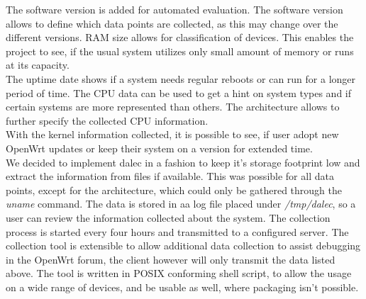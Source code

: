     The software version is added for automated evaluation. The software version allows to define which data points are collected, as this may change over the different versions. RAM size allows for classification of devices. This enables the project to see, if the usual system utilizes only small amount of memory or runs at its capacity.\\
    The uptime date shows if a system needs regular reboots or can run for a longer period of time. The CPU data can be used to get a hint on system types and if certain systems are more represented than others. The architecture allows to further specify the collected CPU information.\\
    With the kernel information collected, it is possible to see, if user adopt new OpenWrt updates or keep their system on a version for extended time.\\
    
    We decided to implement dalec in a fashion to keep it's storage footprint low and extract the information from files if available. This was possible for all data points, except for the architecture, which could only be gathered through the \textit{uname} command. The data is stored in aa log file placed under \textit{/tmp/dalec}, so a user can review the information collected about the system. The collection process is started every four hours and transmitted to a configured server. The collection tool is extensible to allow additional data collection to assist debugging in the OpenWrt forum, the client however will only transmit the data listed above. The tool is written in POSIX conforming shell script, to allow the usage on a wide range of devices, and be usable as well, where packaging isn't possible.
%
